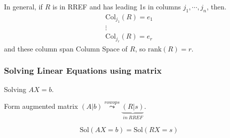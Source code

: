 \documentclass[12pt]{article}
\theoremstyle{plain}
\newcommand{\rank}{\mathrm{rank}}
\newcommand{\Col}{\mathrm{Col}}
\newcommand{\Sol}{\mathrm{Sol}}
\begin{document}
In general, if $R$ is in RREF and has leading 1s in columns $j_1,\cdots, j_n$,
then.
\begin{align*}
	\Col_{j_1}(R) = e_1	\\
	\vdots \\
	\Col_{j_r}(R) = e_r
\end{align*}
and these column span Column Space of $R$, so $\rank(R) = r$. 


\subsubsection{Solving Linear Equations using matrix}
Solving $AX = b$. 

Form augmented matrix $(A|b) \overset{row ops}{\leadsto} 
\underbrace{(R|s)}_{in \ RREF}$. 

\[
	\Sol(AX = b) = \Sol(RX = s)
\]
\end{document}
